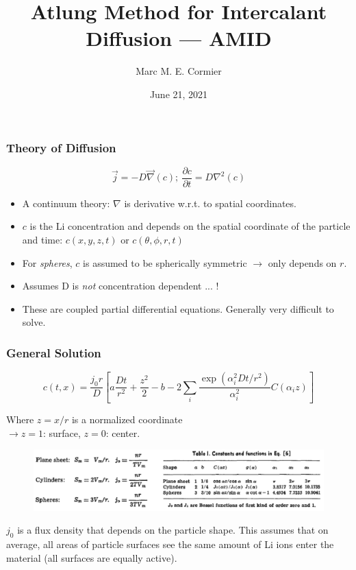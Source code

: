 \documentclass{beamer}
\title[AMID]{Atlung Method for Intercalant Diffusion --- AMID}
\author{Marc M. E. Cormier} %
\institute[] %
{
	Dalhousie University \\ %
	\medskip
	\textit{marc.cormier@dal.ca} %
}
\date{June 21, 2021} %
\begin{document}
	
\begin{frame}
\titlepage %
\end{frame}

\begin{frame}
\frametitle{Theory of Diffusion}

	\begin{equation*}
	\vec{j} = -D \vec{\nabla}(c);\ \frac{\partial c}{\partial t} = D \nabla^2(c)
	\end{equation*}
	\begin{itemize}
		\item A continuum theory: $\nabla$ is derivative w.r.t. to spatial coordinates.
		\item $c$ is the Li concentration and depends on the spatial coordinate of the particle and time: $c(x,y,z,t)$ or $c(\theta,\phi,r,t)$
		\item For \emph{spheres}, $c$ is assumed to be spherically symmetric $\rightarrow$ only depends on $r$.
		\item {\color{red} Assumes D is \emph{not} concentration dependent ... !}
		\item These are coupled partial differential equations. Generally very difficult to solve.
	\end{itemize}
	 
\end{frame}

\begin{frame}
\frametitle{General Solution}

\begin{equation*}
c(t,x) = \frac{j_0 r}{D} \left[ a\frac{Dt}{r^2} + \frac{z^2}{2} - b - 2 \sum_{i} \frac{\exp(\alpha_i^2Dt/r^2)}{\alpha_i^2} C(\alpha_i z) \right]
\end{equation*}

Where $z=x/r$ is a normalized coordinate \\ 
$\rightarrow z=1$: surface, $z=0$: center.

\begin{figure}
	\includegraphics[width=1.0\linewidth]{figs/diff_eqn_parameters.pdf}
\end{figure}

$j_0$ is a flux density that depends on the particle shape. This assumes that on average, all areas of particle surfaces see the same amount of Li ions enter the material (all surfaces are equally active).


\end{frame}
\end{document}
